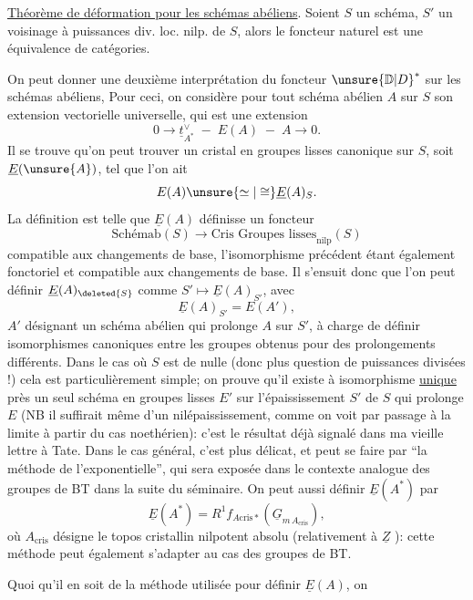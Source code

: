 \uline{Théorème de déformation pour les schémas abéliens}. Soient $S$ un schéma, $S'$ un voisinage à puissances div. loc. nilp. de $S$, alors le foncteur naturel
est une équivalence de catégories.

 On peut donner une deuxième interprétation du foncteur $\unsure{\mathbb D|D}^*$ sur les
schémas abéliens,  Pour ceci, on considère pour tout schéma abélien $A$ sur $S$ son extension vectorielle universelle, qui est une extension
\[
0\longrightarrow\underline t_{A^*}^{\vee}\;-\;E(A)\;-\;A\longrightarrow0.
\]
Il se trouve qu'on peut trouver un cristal en groupes lisses canonique sur $S$, soit $\underline E(\unsure{A})$, tel que l'on ait
\[
E(A)\unsure{\simeq|\cong}\underline E(A)_S.
\]
La définition est telle que  $\underline E(A)$ définisse un foncteur
\[
\text{Schémab}(S)\longrightarrow\text{Cris Groupes lisses}_{\mathrm{nilp}}(S)
\]
compatible aux changements de base, l'isomorphisme précédent étant également fonctoriel et compatible aux changements de base. Il s'ensuit donc que l'on peut définir $\underline E(A)_{\deleted{S}}$ comme $S'\mapsto\underline E(A)_{S'}$, avec
\[
\underline E(A)_{S'}=E(A'),
\]
$A'$ désignant un schéma abélien qui prolonge $A$ sur $S'$,  à charge de définir  isomorphismes canoniques entre les groupes obtenus pour des prolongements différents. Dans le cas où $S$ est de  nulle (donc plus question de puissances divisées !) cela est particulièrement simple; on prouve qu'il existe à isomorphisme \uline{unique} près un seul schéma en groupes lisses $E'$ sur l'épaississement $S'$ de $S$ qui prolonge $E$ (NB il suffirait même d'un nilépaississement, comme on voit par passage à la limite à partir du cas noethérien): c'est le résultat déjà signalé dans ma vieille lettre à Tate. Dans le cas général, c'est plus délicat, et peut se faire par ``la méthode de l'exponentielle'', qui sera exposée dans le contexte analogue des groupes de BT dans la suite du séminaire. On peut aussi définir $\underline E(A^*)$ par
\[
\underline E(A^*)=R^1f_{A\mathrm{cris}*}(\underline G_{m\,A_{\mathrm{cris}}}),
\]
où $A_{\mathrm{cris}}$ désigne le topos cristallin  nilpotent absolu (relativement à $\underline Z$ ): cette méthode peut également s'adapter au cas des groupes de BT.

Quoi qu'il en soit de la méthode utilisée pour définir $\underline E(A)$, on
